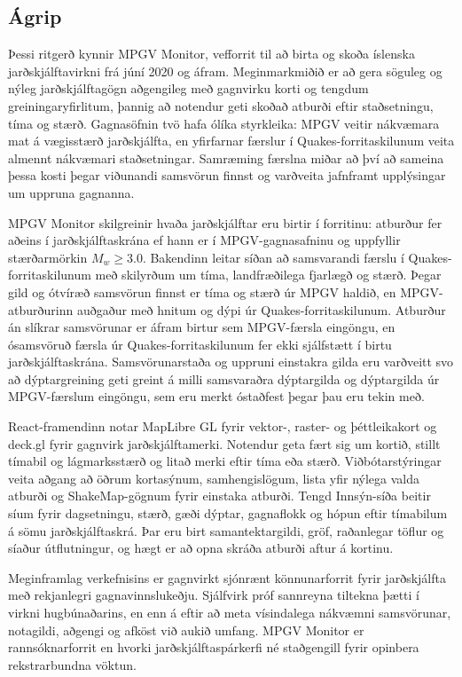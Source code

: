 \documentclass[12pt]{article}
\begin{document}
\begin{otherlanguage}{icelandic}
\section*{\huge Ágrip}
Þessi ritgerð kynnir MPGV Monitor, vefforrit til að birta og skoða íslenska jarðskjálftavirkni frá júní 2020 og áfram. Meginmarkmiðið er að gera söguleg og nýleg jarðskjálftagögn aðgengileg með gagnvirku korti og tengdum greiningaryfirlitum, þannig að notendur geti skoðað atburði eftir staðsetningu, tíma og stærð. Gagnasöfnin tvö hafa ólíka styrkleika: MPGV veitir nákvæmara mat á vægisstærð jarðskjálfta, en yfirfarnar færslur í Quakes-forritaskilunum veita almennt nákvæmari staðsetningar. Samræming færslna miðar að því að sameina þessa kosti þegar viðunandi samsvörun finnst og varðveita jafnframt upplýsingar um uppruna gagnanna.

MPGV Monitor skilgreinir hvaða jarðskjálftar eru birtir í forritinu: atburður fer aðeins í jarðskjálftaskrána ef hann er í MPGV-gagnasafninu og uppfyllir stærðarmörkin $M_w \geq 3.0$. Bakendinn leitar síðan að samsvarandi færslu í Quakes-forritaskilunum með skilyrðum um tíma, landfræðilega fjarlægð og stærð. Þegar gild og ótvíræð samsvörun finnst er tíma og stærð úr MPGV haldið, en MPGV-atburðurinn auðgaður með hnitum og dýpi úr Quakes-forritaskilunum. Atburður án slíkrar samsvörunar er áfram birtur sem MPGV-færsla eingöngu, en ósamsvöruð færsla úr Quakes-forritaskilunum fer ekki sjálfstætt í birtu jarðskjálftaskrána. Samsvörunarstaða og uppruni einstakra gilda eru varðveitt svo að dýptargreining geti greint á milli samsvaraðra dýptargilda og dýptargilda úr MPGV-færslum eingöngu, sem eru merkt óstaðfest þegar þau eru tekin með.

React-framendinn notar MapLibre GL fyrir vektor-, raster- og þéttleikakort og deck.gl fyrir gagnvirk jarðskjálftamerki. Notendur geta fært sig um kortið, stillt tímabil og lágmarksstærð og litað merki eftir tíma eða stærð. Viðbótarstýringar veita aðgang að öðrum kortasýnum, samhengislögum, lista yfir nýlega valda atburði og ShakeMap-gögnum fyrir einstaka atburði. Tengd Innsýn-síða beitir síum fyrir dagsetningu, stærð, gæði dýptar, gagnaflokk og hópun eftir tímabilum á sömu jarðskjálftaskrá. Þar eru birt samantektargildi, gröf, raðanlegar töflur og síaður útflutningur, og hægt er að opna skráða atburði aftur á kortinu.

Meginframlag verkefnisins er gagnvirkt sjónrænt könnunarforrit fyrir jarðskjálfta með rekjanlegri gagnavinnslukeðju. Sjálfvirk próf sannreyna tiltekna þætti í virkni hugbúnaðarins, en enn á eftir að meta vísindalega nákvæmni samsvörunar, notagildi, aðgengi og afköst við aukið umfang. MPGV Monitor er rannsóknarforrit en hvorki jarðskjálftaspárkerfi né staðgengill fyrir opinbera rekstrarbundna vöktun.
\end{otherlanguage}
\end{document}
